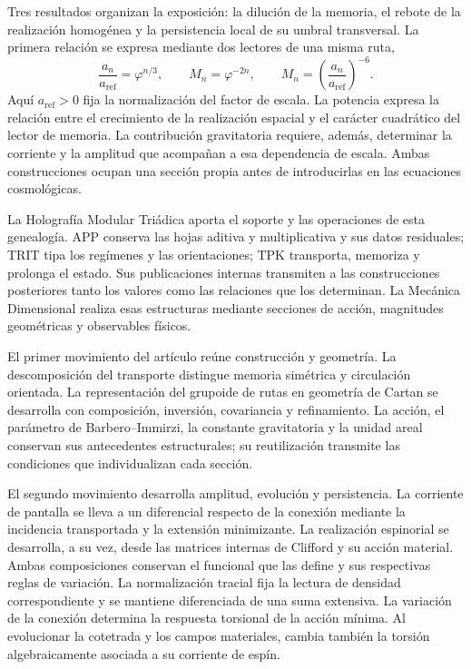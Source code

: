 Tres resultados organizan la exposición: la dilución de la memoria, el
rebote de la realización homogénea y la persistencia local de su umbral
transversal. La primera relación se expresa mediante dos lectores de una
misma ruta,
\begin{equation}
 \frac{a_n}{a_{\mathrm{ref}}}=\varphi^{n/3},
 \qquad M_n=\varphi^{-2n},
 \qquad
 M_n=\left(\frac{a_n}{a_{\mathrm{ref}}}\right)^{-6}.
 \label{vii:eq:programa-dilucion}
\end{equation}
Aquí \(a_{\mathrm{ref}}>0\) fija la normalización del factor de escala.
La potencia expresa la relación entre el crecimiento de la realización
espacial y el carácter cuadrático del lector de memoria. La contribución
gravitatoria requiere, además, determinar la corriente y la amplitud que
acompañan a esa dependencia de escala. Ambas construcciones ocupan una
sección propia antes de introducirlas en las ecuaciones cosmológicas.

La Holografía Modular Triádica aporta el soporte y las operaciones de esta
genealogía. APP conserva las hojas aditiva y multiplicativa y sus datos
residuales; TRIT tipa los regímenes y las orientaciones; TPK transporta,
memoriza y prolonga el estado. Sus publicaciones internas transmiten a
las construcciones posteriores tanto los valores como las relaciones que
los determinan. La Mecánica Dimensional realiza esas estructuras mediante
secciones de acción, magnitudes geométricas y observables físicos.

El primer movimiento del artículo reúne construcción y geometría. La
descomposición del transporte distingue memoria simétrica y circulación
orientada. La representación del grupoide de rutas en geometría de Cartan
se desarrolla con composición, inversión, covariancia y refinamiento. La
acción, el parámetro de Barbero--Immirzi, la constante gravitatoria y la
unidad areal conservan sus antecedentes estructurales; su reutilización
transmite las condiciones que individualizan cada sección.

El segundo movimiento desarrolla amplitud, evolución y persistencia.
La corriente de pantalla se lleva a un diferencial respecto de la
conexión mediante la incidencia transportada y la extensión minimizante.
La realización espinorial se desarrolla, a su vez, desde las matrices
internas de Clifford y su acción material. Ambas composiciones conservan
el funcional que las define y sus respectivas reglas de variación.
La normalización tracial
fija la lectura de densidad correspondiente y se mantiene diferenciada de
una suma extensiva. La variación de la conexión determina la respuesta
torsional de la acción mínima. Al evolucionar la cotetrada y los campos
materiales, cambia también la torsión algebraicamente asociada a su
corriente de espín.

